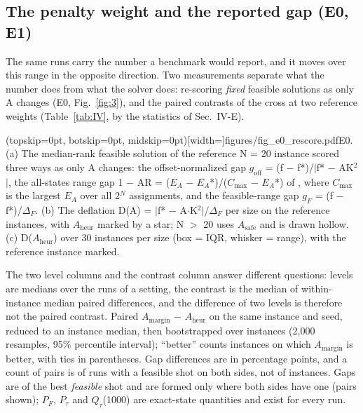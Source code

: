 \documentclass{ieeeaccess}
\begin{document}
\subsection{The penalty weight and the reported gap (E0, E1)}


The same runs carry the number a benchmark would report, and it moves over this range in the opposite direction. Two measurements separate what the number does from what the solver does: re-scoring \textit{fixed} feasible solutions as only A changes (E0, Fig.~\ref{fig:3}), and the paired contrasts of the cross at two reference weights (Table~\ref{tab:IV}, by the statistics of Sec.~IV-E).

\Figure[!t](topskip=0pt, botskip=0pt, midskip=0pt)[width=\textwidth]{figures/fig_e0_rescore.pdf}{E0. (a) The median-rank feasible solution of the reference N = 20 instance scored three ways as only A changes: the offset-normalized gap $g_{\mathrm{off}}$ = (f $-$ f*)/$|$f* $-$ AK$^{2}$$|$, the all-states range gap 1 $-$ AR = ($E_{A}$ $-$ $E_{A}$*)/($C_{\mathrm{max}}$ $-$ $E_{A}$*) of \cite{ref22}, where $C_{\mathrm{max}}$ is the largest $E_{A}$ over all 2$^{N}$ assignments, and the feasible-range gap $g_{F}$ = (f $-$ f*)/$\Delta_{F}$. (b) The deflation D(A) = $|$f* $-$ A$\cdot$K$^{2}$$|$/$\Delta_{F}$ per size on the reference instances, with $A_{\mathrm{heur}}$ marked by a star; N $>$ 20 uses $A_{\mathrm{safe}}$ and is drawn hollow. (c) D($A_{\mathrm{heur}}$) over 30 instances per size (box = IQR, whisker = range), with the reference instance marked.\label{fig:3}}



The two level columns and the contrast column answer different questions: levels are medians over the runs of a setting, the contrast is the median of within-instance median paired differences, and the difference of two levels is therefore not the paired contrast. Paired $A_{\mathrm{margin}}$ $-$ $A_{\mathrm{heur}}$ on the same instance and seed, reduced to an instance median, then bootstrapped over instances (2,000 resamples, 95\% percentile interval); ``better'' counts instances on which $A_{\mathrm{margin}}$ is better, with ties in parentheses. Gap differences are in percentage points, and a count of pairs is of runs with a feasible shot on both sides, not of instances. Gaps are of the best \textit{feasible} shot and are formed only where both sides have one (pairs shown); $P_{F}$, $P_{\tau}$ and $Q_{\tau}$(1000) are exact-state quantities and exist for every run.
\end{document}
